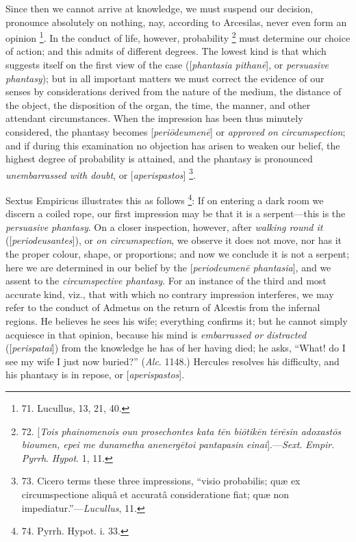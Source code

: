 Since then we cannot arrive at
knowledge, we must suspend our decision, pronounce absolutely on
nothing, nay, according to Arcesilas, never even form an opinion \footnote{71. Lucullus, 13, 21, 40.}. In the conduct of life, however, probability \footnote{72. [\emph{Tois phainomenois oun
prosechontes kata t\={e}n bi\={o}tik\={e}n t\={e}r\={e}sin
adoxast\={o}s bioumen, epei me dunametha anenerg\={e}toi
pantapasin einai}].—\emph{Sext}. \emph{Empir}. \emph{Pyrrh}. \emph{Hypot}.
1, 11.} must determine our choice of action; and this admits of
different degrees. The lowest kind is that which suggests itself on
the first view of the case ([\emph{phantasia pithan\={e}}], or \emph{persuasive
phantasy}); but in all important matters we must correct the
evidence of our senses by considerations derived from the nature of
the medium, the distance of the object, the disposition of the organ,
the time, the manner, and other attendant circumstances. When the
impression has been thus minutely considered, the phantasy becomes [\emph{peri\={o}deumen\={e}}]
or \emph{approved on circumspection}; and if during this examination
no objection has arisen to weaken our belief, the highest degree of
probability is attained, and the phantasy is pronounced \emph{unembarrassed
with doubt}, or [\emph{aperispastos}] \footnote{73. Cicero terms these three
impressions, ``visio probabilis; quæ ex circumspectione aliquâ et
accuratâ consideratione fiat; quæ non impediatur.''—\emph{Lucullus},
11.}.

Sextus Empiricus illustrates
this as follows \footnote{74.
Pyrrh. Hypot. i. 33.}: If on
entering a dark room we discern a coiled rope, our first impression may be that it is a serpent—this is the \emph{persuasive
phantasy}. On a closer inspection, however, after \emph{walking round
it} ([\emph{periodeusantes}]), or \emph{on circumspection}, we
observe it does not move, nor has it the proper colour, shape, or
proportions; and now we conclude it is not a serpent; here we are
determined in our belief by the [\emph{periodeumen\={e} phantasia}],
and we assent to the \emph{circumspective phantasy}. For an instance
of the third and most accurate kind, viz., that with which no contrary
impression interferes, we may refer to the conduct of Admetus on the
return of Alcestis from the infernal regions. He believes he sees his
wife; everything confirms it; but he cannot simply acquiesce in that
opinion, because his mind is \emph{embarrassed} \emph{or distracted}
([\emph{perispatai}]) from the knowledge he has of her having died; he
asks, ``What! do I see my wife I just now buried?'' (\emph{Alc}. 1148.)
Hercules resolves his difficulty, and his phantasy is in repose, or [\emph{aperispastos}].

